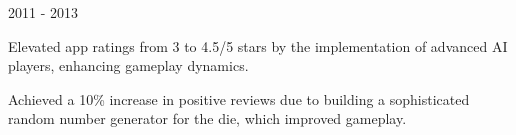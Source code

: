 \begin{cventries}
    


  \cventrythin
    {} %
    {2011 - 2013} %
    {
          \begin{cvitems} %
	          	\item {Elevated app ratings from 3 to 4.5/5 stars by the implementation of advanced AI players, enhancing gameplay dynamics.}
				\item {Achieved a 10\% increase in positive reviews due to building a sophisticated random number generator for the die, which improved gameplay.}
	      \end{cvitems}
    }
    
    



    
    

\end{cventries}
